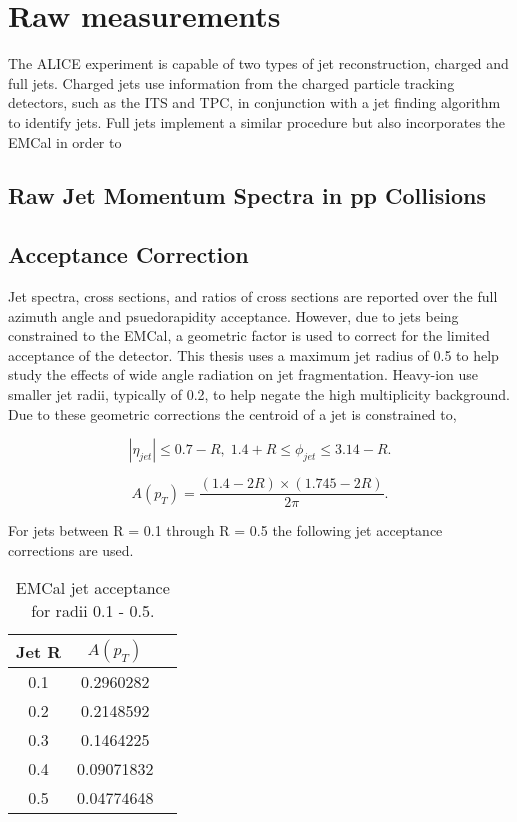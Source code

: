 \section{Raw measurements}
The ALICE experiment is capable of two types of jet reconstruction, charged and full jets.  Charged jets use information from the charged particle tracking detectors, such as the ITS and TPC, in conjunction with a jet finding algorithm to identify jets.  Full jets implement a similar procedure but also incorporates the EMCal in order to 

\subsection{Raw Jet Momentum Spectra in pp Collisions}

\subsection{Acceptance Correction}
Jet spectra, cross sections, and ratios of cross sections are reported over the full azimuth angle and psuedorapidity acceptance.  However, due to jets being constrained to the EMCal, a geometric factor is used to correct for the limited acceptance of the detector.  This thesis uses a maximum jet radius of 0.5 to help study the effects of wide angle radiation on jet fragmentation.  Heavy-ion use smaller jet radii, typically of 0.2, to help negate the high multiplicity background.  Due to these geometric corrections the centroid of a jet is constrained to,

\begin{equation}
|\eta_{jet}| \leq 0.7 - R, \; 1.4 + R \leq \phi_{jet} \leq 3.14 -R.
\label{eq:jetconstration}
\end{equation}

\begin{equation}
A(p_{T}) = \frac{(1.4 - 2R) \times (1.745 - 2R)}{2 \pi}.
\label{eq:acceptance}
\end{equation}

For jets between R = 0.1 through R = 0.5 the following jet acceptance corrections are used.

\begin{table}[hb]
\label{tab:AcceptanceFactor}
\begin{center}
\begin{tabular}[b]{|c|c|c|}
	\hline
	Jet R & $A(p_{T})$ \\ \hline
	0.1 & 0.2960282 \\ \hline
	0.2 & 0.2148592 \\ \hline
	0.3 & 0.1464225 \\ \hline
	0.4 & 0.09071832 \\ \hline
	0.5 & 0.04774648\\ \hline
\end{tabular}
\end{center}
\caption{EMCal jet acceptance for radii 0.1 - 0.5.}
\end{table}








